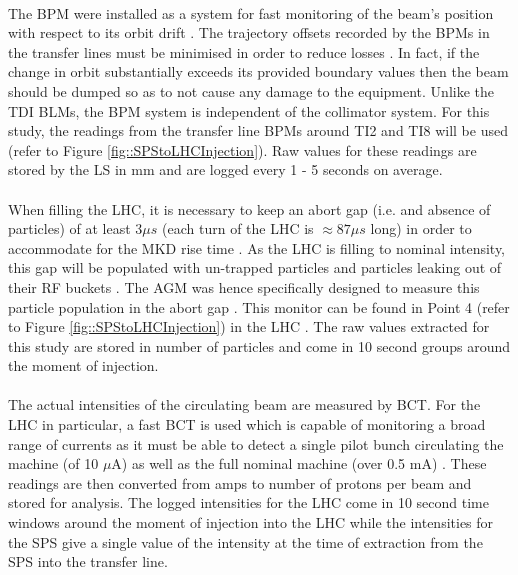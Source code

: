 \paragraph{ }The \ac{BPM} were installed as a system for fast monitoring of the beam's position with respect to its orbit drift \cite{Schmidt2006}. The trajectory offsets recorded by the \acs{BPM}s in the transfer lines must be minimised in order to reduce losses \cite{Drosdal2011}. In fact, if the change in orbit substantially exceeds its provided boundary values then the beam should be dumped \cite{Schmidt2006} so as to not cause any damage to the equipment. Unlike the \acs{TDI} \acs{BLM}s, the \acs{BPM} system is independent of the collimator system. For this study, the readings from the transfer line \acs{BPM}s around TI2 and TI8 will be used (refer to Figure \ref{fig::SPStoLHCInjection}). Raw values for these readings are stored by the \acs{LS} in mm and are logged every 1 - 5 seconds on average.

\paragraph{ }When filling the \acs{LHC}, it is necessary to keep an abort gap (i.e. and absence of particles) of at least 3$\mu s$ (each turn of the \acs{LHC} is $\approx87\mu s$ long) in order to accommodate for the \ac{MKD} rise time \cite{Meddahi2010}. As the \ac{LHC} is filling to nominal intensity, this gap will be populated with un-trapped particles and particles leaking out of their \ac{RF} buckets \cite{Meddahi2010}. The \ac{AGM} was hence specifically designed to measure this particle population in the abort gap \cite{Lefevre2010}. This monitor can be found in Point 4 (refer to Figure \ref{fig::SPStoLHCInjection}) in the LHC \cite{Lefevre2010}. The raw values extracted for this study are stored in number of particles and come in 10 second groups around the moment of injection.
 
\paragraph{ }The actual intensities of the circulating beam are measured by \ac{BCT}. For the \acs{LHC} in particular, a fast \acs{BCT} is used which is capable of monitoring a broad range of currents as it must be able to detect a single pilot bunch circulating the machine (of 10 $\mu$A) as well as the full nominal machine (over 0.5 mA) \cite{Jones2007}. These readings are then converted from amps to number of protons per beam and stored for analysis. The logged intensities for the \acs{LHC} come in 10 second time windows around the moment of injection into the \acs{LHC} while the intensities for the \acs{SPS} give a single value of the intensity at the time of extraction from the \acs{SPS} into the transfer line. 

